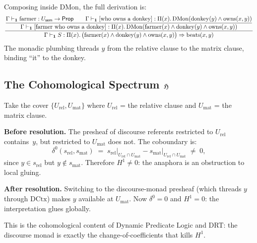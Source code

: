 Composing inside $\mathrm{DMon}$, the full derivation is:
\[
  \dfrac{
    \dfrac{
      \Gamma\vdash_{\mathbf{1}} \text{farmer}:U_{\mathsf{sem}}\to\mathsf{Prop}
      \qquad
      \Gamma\vdash_{\mathbf{1}}
        [\text{who owns a donkey}] :
        \Pi(x).\,\mathrm{DMon}(\mathrm{donkey}(y)\wedge\mathrm{owns}(x,y))
    }{
      \Gamma\vdash_{\mathbf{1}}
        [\text{farmer who owns a donkey}] :
        \Pi(x).\,\mathrm{DMon}(\mathrm{farmer}(x)\wedge
                                \mathrm{donkey}(y)\wedge
                                \mathrm{owns}(x,y))
    }
  }{
    \Gamma\vdash_{\mathbf{1}}
      S : \Pi(x).\,
          \bigl(\mathrm{farmer}(x)\wedge\mathrm{donkey}(y)
                \wedge\mathrm{owns}(x,y)\bigr)
          \Rightarrow\mathrm{beats}(x,y)
  }
\]
The monadic plumbing threads $y$ from the relative clause to the
matrix clause, binding ``it'' to the donkey.

\subsection{The Cohomological Spectrum $\mathfrak{H}$}

\begin{construction}
\label{con:clause-cover}
Take the cover $\{U_{\mathrm{rel}},U_{\mathrm{mat}}\}$ where
$U_{\mathrm{rel}}$ = the relative clause and
$U_{\mathrm{mat}}$ = the matrix clause.
\end{construction}

\textbf{Before resolution.}\quad
The presheaf of discourse referents restricted to $U_{\mathrm{rel}}$
contains~$y$, but restricted to $U_{\mathrm{mat}}$ does not.
The coboundary is:
\[
  \delta^0(s_{\mathrm{rel}},s_{\mathrm{mat}})
  \;=\;
  s_{\mathrm{rel}}\big|_{U_{\mathrm{rel}}\cap U_{\mathrm{mat}}}
  - s_{\mathrm{mat}}\big|_{U_{\mathrm{rel}}\cap U_{\mathrm{mat}}}
  \;\neq\; 0,
\]
since $y\in s_{\mathrm{rel}}$ but $y\notin s_{\mathrm{mat}}$.
Therefore $H^1\neq 0$: the anaphora is an obstruction to local
gluing.

\textbf{After resolution.}\quad
Switching to the discourse-monad presheaf (which threads $y$
through $\mathrm{DCtx}$) makes $y$ available at
$U_{\mathrm{mat}}$.  Now $\delta^0=0$ and $H^1=0$: the
interpretation glues globally.

\begin{remark}
This is the cohomological content of Dynamic Predicate Logic
and DRT: the discourse monad is exactly the change-of-coefficients
that kills $H^1$.
\end{remark}

